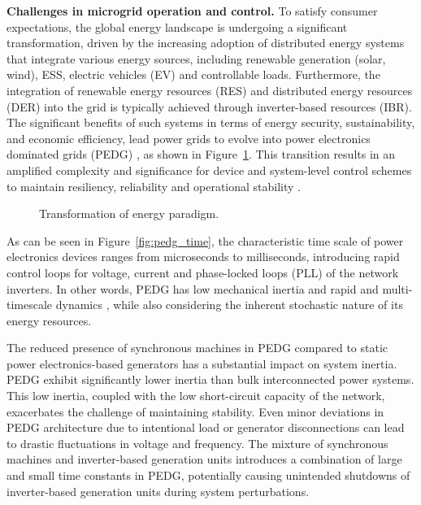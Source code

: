 \textbf{Challenges in microgrid operation and control.}
To satisfy consumer expectations, the global energy landscape is undergoing a significant transformation, driven by the increasing adoption of distributed energy systems that integrate various energy sources, including renewable generation (solar, wind), ESS, electric vehicles (EV) and controllable loads. Furthermore, the integration of renewable energy resources (RES) and distributed energy resources (DER) into the grid is typically achieved through inverter-based resources (IBR). The significant benefits of such systems in terms of energy security, sustainability, and economic efficiency, lead power grids to evolve into power electronics dominated grids (PEDG) \autocite{mag_ipakchi_2009}, as shown in Figure~\cref{fig:bulk2pedg}. This transition results in an amplified complexity and significance for device and system-level control schemes to maintain resiliency, reliability and operational stability \autocite{mag_khan_2020}. 


\begin{figure}[ht]
    \caption{Transformation of energy paradigm.}\label{fig:bulk2pedg}
\end{figure}

As can be seen in Figure~\cref{fig:pedg_time}, the characteristic time scale of power electronics devices ranges from microseconds to milliseconds, introducing rapid control loops for voltage, current and phase-locked loops (PLL) of the network inverters. In other words, PEDG has low mechanical inertia and rapid and multi-timescale dynamics \autocite{7182342}, while also considering the inherent stochastic nature of its energy resources.


The reduced presence of synchronous machines in PEDG compared to static power electronics-based generators has a substantial impact on system inertia. PEDG exhibit significantly lower inertia than bulk interconnected power systems. This low inertia, coupled with the low short-circuit capacity of the network, exacerbates the challenge of maintaining stability. Even minor deviations in PEDG architecture due to intentional load or generator disconnections can lead to drastic fluctuations in voltage and frequency. The mixture of synchronous machines and inverter-based generation units introduces a combination of large and small time constants in PEDG, potentially causing unintended shutdowns of inverter-based generation units during system perturbations.

